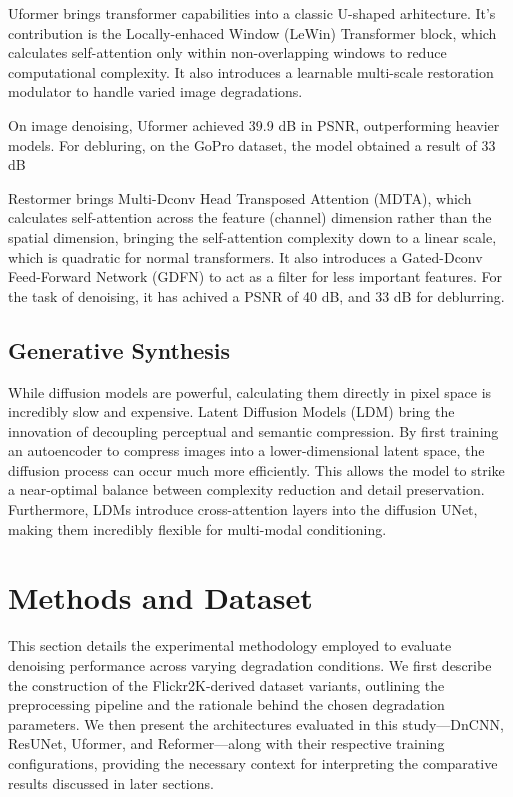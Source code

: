 \documentclass[conference]{IEEEtran}
\begin{document}
Uformer brings transformer capabilities into a classic U-shaped arhitecture. It's contribution is
the Locally-enhaced Window (LeWin) Transformer block, which calculates self-attention only within
non-overlapping windows to reduce computational complexity. It also introduces a learnable
multi-scale restoration modulator to handle varied image degradations. \cite{Uformer}

On image denoising, Uformer achieved 39.9 dB in PSNR, outperforming heavier models. For debluring,
on the GoPro dataset, the model obtained a result of 33 dB 

Restormer brings Multi-Dconv Head Transposed Attention (MDTA), which calculates self-attention
across the feature (channel) dimension rather than the spatial dimension, bringing the
self-attention complexity down to a linear scale, which is quadratic for normal transformers. It
also introduces a Gated-Dconv Feed-Forward Network (GDFN) to act as a filter for less important
features. For the task of denoising, it has achived a PSNR of 40 dB, and 33 dB for deblurring.
\cite{Restormer}

\subsection{Generative Synthesis}

While diffusion models are powerful, calculating them directly in pixel space is incredibly slow and
expensive. Latent Diffusion Models (LDM) bring the innovation of decoupling perceptual and semantic
compression. By first training an autoencoder to compress images into a lower-dimensional latent
space, the diffusion process can occur much more efficiently. This allows the model to strike a
near-optimal balance between complexity reduction and detail preservation. Furthermore, LDMs
introduce cross-attention layers into the diffusion UNet, making them incredibly flexible for
multi-modal conditioning. \cite{High-Resolution_image}


\section{Methods and Dataset}
\label{sec:dataset}

This section details the experimental methodology employed to evaluate
denoising performance across varying degradation conditions. We first describe
the construction of the Flickr2K-derived dataset variants, outlining the
preprocessing pipeline and the rationale behind the chosen degradation
parameters. We then present the architectures evaluated in this study—DnCNN,
ResUNet, Uformer, and Reformer—along with their respective training
configurations, providing the necessary context for interpreting the
comparative results discussed in later sections.
\end{document}
